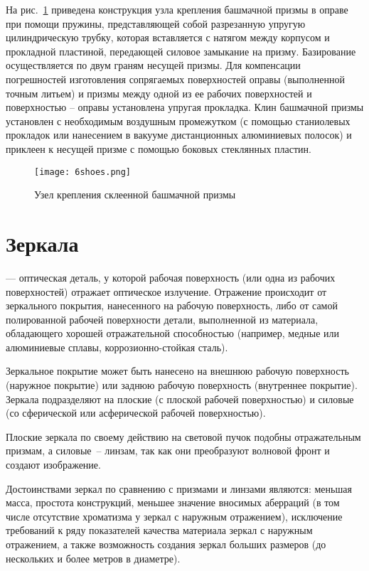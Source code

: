 На рис.~\ref{pic:6shoes} приведена конструкция узла крепления башмачной призмы в оправе при помощи пружины, представляющей собой разрезанную упругую цилиндрическую трубку, которая вставляется с натягом между корпусом и прокладной пластиной, передающей силовое замыкание на призму. Базирование осуществляется по двум граням несущей призмы. Для компенсации погрешностей изготовления сопрягаемых поверхностей оправы (выполненной точным литьем) и призмы между одной из ее рабочих поверхностей и поверхностью -- оправы установлена упругая прокладка. Клин башмачной призмы установлен с необходимым воздушным промежутком (с помощью станиолевых прокладок или нанесением в вакууме дистанционных алюминиевых полосок) и приклеен к несущей призме с помощью боковых стеклянных пластин.

\begin{figure}[h!]
	\texttt{[image: 6shoes.png]}
	\caption{ Узел крепления склеенной башмачной призмы }
	\label{pic:6shoes}
\end{figure}

\section{Зеркала}

  --- оптическая деталь, у которой рабочая поверхность (или одна из рабочих поверхностей) отражает оптическое излучение. Отражение происходит от зеркального покрытия, нанесенного на рабочую поверхность, либо от самой полированной рабочей поверхности детали, выполненной из материала, обладающего хорошей отражательной способностью (например, медные или алюминиевые сплавы, коррозионно-стойкая сталь).

Зеркальное покрытие может быть нанесено на внешнюю рабочую поверхность (наружное покрытие) или заднюю рабочую поверхность (внутреннее покрытие).
Зеркала подразделяют на плоские (с плоской рабочей поверхностью) и силовые (со сферической или асферической рабочей поверхностью).

Плоские зеркала по своему действию на световой пучок подобны отражательным призмам, а силовые~-- линзам, так как они преобразуют волновой фронт и создают изображение.

Достоинствами зеркал по сравнению с призмами и линзами являются: меньшая масса, простота конструкций, меньшее значение вносимых аберраций (в том числе отсутствие хроматизма у зеркал с наружным отражением), исключение требований к ряду показателей качества материала зеркал с наружным отражением, а также возможность создания зеркал больших размеров (до нескольких и более метров в диаметре). 


